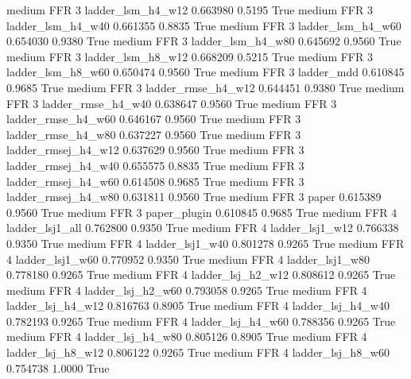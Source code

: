     medium      FFR                 3   ladder_lsm_h4_w12   0.663980      0.5195    True
    medium      FFR                 3   ladder_lsm_h4_w40   0.661355      0.8835    True
    medium      FFR                 3   ladder_lsm_h4_w60   0.654030      0.9380    True
    medium      FFR                 3   ladder_lsm_h4_w80   0.645692      0.9560    True
    medium      FFR                 3   ladder_lsm_h8_w12   0.668209      0.5215    True
    medium      FFR                 3   ladder_lsm_h8_w60   0.650474      0.9560    True
    medium      FFR                 3          ladder_mdd   0.610845      0.9685    True
    medium      FFR                 3  ladder_rmse_h4_w12   0.644451      0.9380    True
    medium      FFR                 3  ladder_rmse_h4_w40   0.638647      0.9560    True
    medium      FFR                 3  ladder_rmse_h4_w60   0.646167      0.9560    True
    medium      FFR                 3  ladder_rmse_h4_w80   0.637227      0.9560    True
    medium      FFR                 3 ladder_rmsej_h4_w12   0.637629      0.9560    True
    medium      FFR                 3 ladder_rmsej_h4_w40   0.655575      0.8835    True
    medium      FFR                 3 ladder_rmsej_h4_w60   0.614508      0.9685    True
    medium      FFR                 3 ladder_rmsej_h4_w80   0.631811      0.9560    True
    medium      FFR                 3               paper   0.615389      0.9560    True
    medium      FFR                 3        paper_plugin   0.610845      0.9685    True
    medium      FFR                 4     ladder_lsj1_all   0.762800      0.9350    True
    medium      FFR                 4     ladder_lsj1_w12   0.766338      0.9350    True
    medium      FFR                 4     ladder_lsj1_w40   0.801278      0.9265    True
    medium      FFR                 4     ladder_lsj1_w60   0.770952      0.9350    True
    medium      FFR                 4     ladder_lsj1_w80   0.778180      0.9265    True
    medium      FFR                 4   ladder_lsj_h2_w12   0.808612      0.9265    True
    medium      FFR                 4   ladder_lsj_h2_w60   0.793058      0.9265    True
    medium      FFR                 4   ladder_lsj_h4_w12   0.816763      0.8905    True
    medium      FFR                 4   ladder_lsj_h4_w40   0.782193      0.9265    True
    medium      FFR                 4   ladder_lsj_h4_w60   0.788356      0.9265    True
    medium      FFR                 4   ladder_lsj_h4_w80   0.805126      0.8905    True
    medium      FFR                 4   ladder_lsj_h8_w12   0.806122      0.9265    True
    medium      FFR                 4   ladder_lsj_h8_w60   0.754738      1.0000    True

